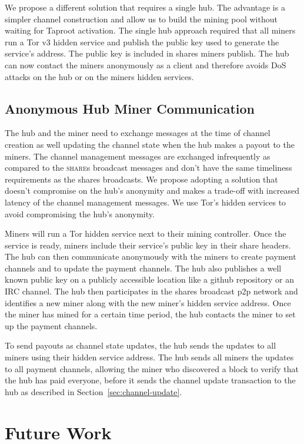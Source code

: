 \documentclass{article}
\begin{document}
We propose a different solution that requires a single hub. The
advantage is a simpler channel construction and allow us to build the
mining pool without waiting for Taproot activation. The single hub
approach required that all miners run a Tor v3 hidden service and
publish the public key used to generate the service's address. The
public key is included in shares miners publish. The hub can now
contact the miners anonymously as a client and therefore avoids DoS
attacks on the hub or on the miners hidden services.

\subsection{Anonymous Hub Miner
  Communication}\label{sec:hub-miner-communication}

The hub and the miner need to exchange messages at the time of channel
creation as well updating the channel state when the hub makes a
payout to the miners. The channel management messages are exchanged
infrequently as compared to the \textsc{share}s broadcast messages and
don't have the same timeliness requirements as the shares
broadcasts. We propose adopting a solution that doesn't compromise on
the hub's anonymity and makes a trade-off with increased latency of
the channel management messages. We use Tor's hidden services to avoid
compromising the hub's anonymity.

Miners will run a Tor hidden service next to their mining
controller. Once the service is ready, miners include their service's
public key in their share headers. The hub can then communicate
anonymously with the miners to create payment channels and to update
the payment channels. The hub also publishes a well known public key
on a publicly accessible location like a github repository or an IRC
channel. The hub then participates in the shares broadcast p2p network
and identifies a new miner along with the new miner's hidden service
address. Once the miner has mined for a certain time period, the hub
contacts the miner to set up the payment channels.

To send payouts as channel state updates, the hub sends the updates to
all miners using their hidden service address. The hub sends all
miners the updates to all payment channels, allowing the miner who
discovered a block to verify that the hub has paid everyone, before it
sends the channel update transaction to the hub as described in
Section~\ref{sec:channel-update}.

\section{Future Work}
\end{document}
